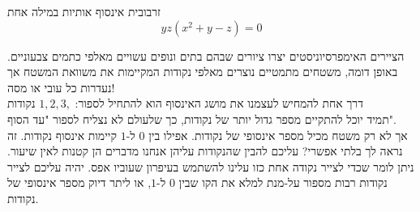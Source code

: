 \begin{surferPage}{זרבובית}
אינסוף אותיות במילה אחת\\
\smallskip
\[y z (x^2	+ y - z)	= 0\]

\vspace{0,3cm}
הציירים האימפרסיוניסטים יצרו ציורים שבהם בתים ונופים עשויים מאלפי כתמים צבעוניים. באופן דומה, משטחים מתמטיים נוצרים מאלפי נקודות המקיימות את משוואת המשטח אך נעדרות כל עובי או מסה! \\
\vspace{0,3cm}
דרך אחת להמחיש לעצמנו את מושג האינסוף הוא להתחיל לספור: $1, 2, 3,$ נקודות\\
תמיד יוכל להתקיים מספר גדול יותר של נקודות, כך שלעולם לא נצליח לספור "עד הסוף".\\
\vspace{0,3cm}
אך לא רק משטח מכיל מספר אינסופי של נקודות. אפילו בין $0$ ל-$1$ קיימות אינסוף נקודות. זה נראה לך בלתי אפשרי? עליכם להבין שהנקודות עליהן אנחנו מדברים הן קטנות לאין שיעור. ניתן לומר שכדי לצייר נקודה אחת כזו עלינו להשתמש בעיפרון שעוביו אפס. יהיה עליכם לצייר נקודות רבות מספור על-מנת למלא את הקו שבין $0$ ל-$1$, או ליתר דיוק מספר אינסופי של נקודות.
\end{surferPage}
